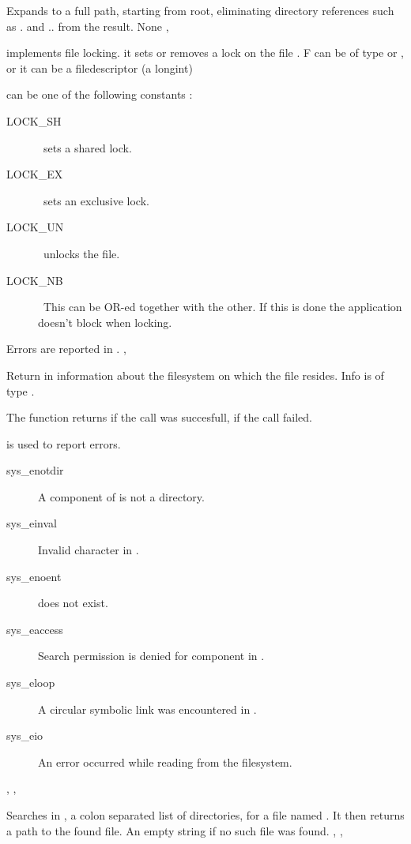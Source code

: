 { Expands  to a full path, starting from root,
eliminating directory references such as . and .. from the result.
}
{None}
{, }



{ implements file locking. it sets or removes a lock on the file
. F can be of type  or , or it can be a \linux
filedescriptor (a longint)

 can be one of the following constants :
\begin{description}
\item [LOCK\_SH] \ sets a shared lock.
\item [LOCK\_EX] \ sets an exclusive lock.
\item [LOCK\_UN] \ unlocks the file.
\item [LOCK\_NB] \ This can be OR-ed together with the other. If this is done
the application doesn't block when locking.
\end{description}
}
{Errors are reported in .}
{, }

{ Return in  information about the filesystem on which the file
 resides. Info is of type .

The function returns  if the call was succesfull,  if the call
failed.
}
{  is used to report errors.
\begin{description}
\item[sys\_enotdir] A component of  is not a directory.
\item[sys\_einval] Invalid character in .
\item[sys\_enoent]  does not exist.
\item[sys\_eaccess] Search permission is denied for  component in
.
\item[sys\_eloop] A circular symbolic link was encountered in .
\item[sys\_eio] An error occurred while reading from the filesystem.
\end{description}
}
{, , }



{ Searches in , a colon separated list of directories,
for a file named . It then returns a path to the found file.}
{An empty string if no such file was found.}
{, ,  }

